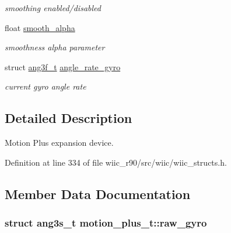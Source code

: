 \begin{DoxyCompactItemize}
\begin{DoxyCompactList}\small\item\em smoothing enabled/disabled \end{DoxyCompactList}\item 
\hypertarget{structmotion__plus__t_ab5eda5d43a79e927542d25338c3a7989}{float \hyperlink{structmotion__plus__t_ab5eda5d43a79e927542d25338c3a7989}{smooth\-\_\-alpha}}\label{structmotion__plus__t_ab5eda5d43a79e927542d25338c3a7989}

\begin{DoxyCompactList}\small\item\em smoothness alpha parameter \end{DoxyCompactList}\item 
\hypertarget{structmotion__plus__t_a221e7d9472c63cb35d2aa9c0e88f5f21}{struct \hyperlink{structang3f__t}{ang3f\-\_\-t} \hyperlink{structmotion__plus__t_a221e7d9472c63cb35d2aa9c0e88f5f21}{angle\-\_\-rate\-\_\-gyro}}\label{structmotion__plus__t_a221e7d9472c63cb35d2aa9c0e88f5f21}

\begin{DoxyCompactList}\small\item\em current gyro angle rate \end{DoxyCompactList}\end{DoxyCompactItemize}


\subsection{Detailed Description}
Motion Plus expansion device. 

Definition at line 334 of file wiic\-\_\-r90/src/wiic/wiic\-\_\-structs.\-h.



\subsection{Member Data Documentation}
\hypertarget{structmotion__plus__t_a57475c270b4209cc7649ab6b7fda336e}{
\subsubsection[{raw\-\_\-gyro}]{\setlength{\rightskip}{0pt plus 5cm}struct {\bf ang3s\-\_\-t} motion\-\_\-plus\-\_\-t\-::raw\-\_\-gyro}}\label{structmotion__plus__t_a57475c270b4209cc7649ab6b7fda336e}


